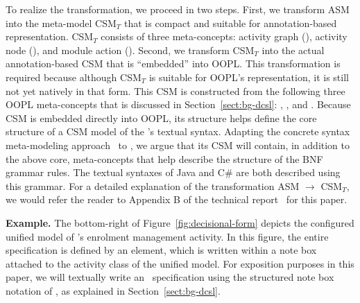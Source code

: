 To realize the transformation, we proceed in two steps. First, we transform ASM into the meta-model CSM$_T$ that is compact and suitable for annotation-based representation. CSM$_T$ consists of three meta-concepts: activity graph (), activity node (), and module action (). Second, we transform CSM$_T$ into the actual annotation-based CSM that is ``embedded'' into OOPL. This transformation is required because although CSM$_T$ is suitable for OOPL's representation, it is still not yet natively in that form. This CSM is constructed from the following three OOPL meta-concepts that is discussed in Section~\ref{sect:bg-dcsl}: , , and . Because CSM is embedded directly into OOPL, its structure helps define the core structure of a CSM model of the \agl's textual syntax. Adapting the concrete syntax meta-modeling approach~\cite{kleppe_software_2008} to \agl, we argue that its CSM will contain, in addition to the above core, meta-concepts that help describe the structure of the BNF grammar rules. The textual syntaxes of Java and C\# are both described using this grammar. For a detailed explanation of the transformation ASM $\rightarrow$ CSM$_T$, we would refer the reader to Appendix B of the technical report~\cite{dang2023aglTechReport} for this paper. 

\noindent \textbf{Example.} The bottom-right of Figure~\ref{fig:decisional-form} depicts the conﬁgured uniﬁed model of \courseman's enrolment management activity. In this figure, the entire \agl~ specification is deﬁned by an  element, which is written within a note box
attached to the activity class  of the uniﬁed model. For exposition purposes in this paper, we will textually write an \agl~specification using the structured note box notation of \dcsl, as explained in Section~\ref{sect:bg-dcsl}. 

